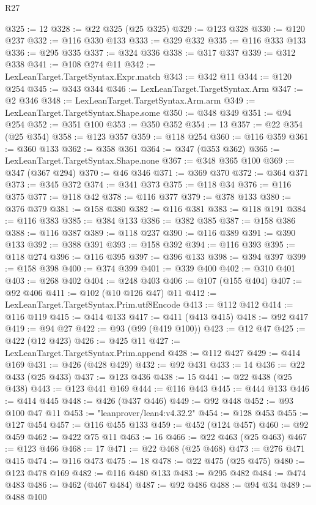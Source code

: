 \begin{lexlean}{R27}
\begin{coremodule}
@325 := 12
@328 := @22 @325 (@25 @325)
@329 := @123 @328
@330 := @120 @237
@332 := @116 @330 @133
@333 := @329 @332
@335 := @116 @333 @133
@336 := @295 @335
@337 := @324 @336
@338 := @317 @337
@339 := @312 @338
@341 := @108 @274 @11
@342 := LexLeanTarget.TargetSyntax.Expr.match
@343 := @342 @11
@344 := @120 @254
@345 := @343 @344
@346 := LexLeanTarget.TargetSyntax.Arm
@347 := @2 @346
@348 := LexLeanTarget.TargetSyntax.Arm.arm
@349 := LexLeanTarget.TargetSyntax.Shape.some
@350 := @348 @349
@351 := @94 @254
@352 := @351 @100
@353 := @350 @352
@354 := 13
@357 := @22 @354 (@25 @354)
@358 := @123 @357
@359 := @118 @254
@360 := @116 @359
@361 := @360 @133
@362 := @358 @361
@364 := @347 (@353 @362)
@365 := LexLeanTarget.TargetSyntax.Shape.none
@367 := @348 @365 @100
@369 := @347 (@367 @294)
@370 := @46 @346
@371 := @369 @370
@372 := @364 @371
@373 := @345 @372
@374 := @341 @373
@375 := @118 @34
@376 := @116 @375
@377 := @118 @42
@378 := @116 @377
@379 := @378 @133
@380 := @376 @379
@381 := @158 @380
@382 := @116 @381
@383 := @118 @191
@384 := @116 @383
@385 := @384 @133
@386 := @382 @385
@387 := @158 @386
@388 := @116 @387
@389 := @118 @237
@390 := @116 @389
@391 := @390 @133
@392 := @388 @391
@393 := @158 @392
@394 := @116 @393
@395 := @118 @274
@396 := @116 @395
@397 := @396 @133
@398 := @394 @397
@399 := @158 @398
@400 := @374 @399
@401 := @339 @400
@402 := @310 @401
@403 := @268 @402
@404 := @248 @403
@406 := @107 (@155 @404)
@407 := @92 @406
@411 := @102 (@10 @126 @47) @11
@412 := LexLeanTarget.TargetSyntax.Prim.utf8Encode
@413 := @112 @412
@414 := @116 @119
@415 := @414 @133
@417 := @411 (@413 @415)
@418 := @92 @417
@419 := @94 @27
@422 := @93 (@99 (@419 @100))
@423 := @12 @47
@425 := @422 (@12 @423)
@426 := @425 @11
@427 := LexLeanTarget.TargetSyntax.Prim.append
@428 := @112 @427
@429 := @414 @169
@431 := @426 (@428 @429)
@432 := @92 @431
@433 := 14
@436 := @22 @433 (@25 @433)
@437 := @123 @436
@438 := 15
@441 := @22 @438 (@25 @438)
@443 := @123 @441 @169
@444 := @116 @443
@445 := @444 @133
@446 := @414 @445
@448 := @426 (@437 @446)
@449 := @92 @448
@452 := @93 @100 @47 @11
@453 := "leanprover/lean4:v4.32.2"
@454 := @128 @453
@455 := @127 @454
@457 := @116 @455 @133
@459 := @452 (@124 @457)
@460 := @92 @459
@462 := @422 @75 @11
@463 := 16
@466 := @22 @463 (@25 @463)
@467 := @123 @466
@468 := 17
@471 := @22 @468 (@25 @468)
@473 := @276 @471 @415
@474 := @116 @473
@475 := 18
@478 := @22 @475 (@25 @475)
@480 := @123 @478 @169
@482 := @116 @480 @133
@483 := @295 @482
@484 := @474 @483
@486 := @462 (@467 @484)
@487 := @92 @486
@488 := @94 @34
@489 := @488 @100

\end{coremodule}
\end{lexlean}
